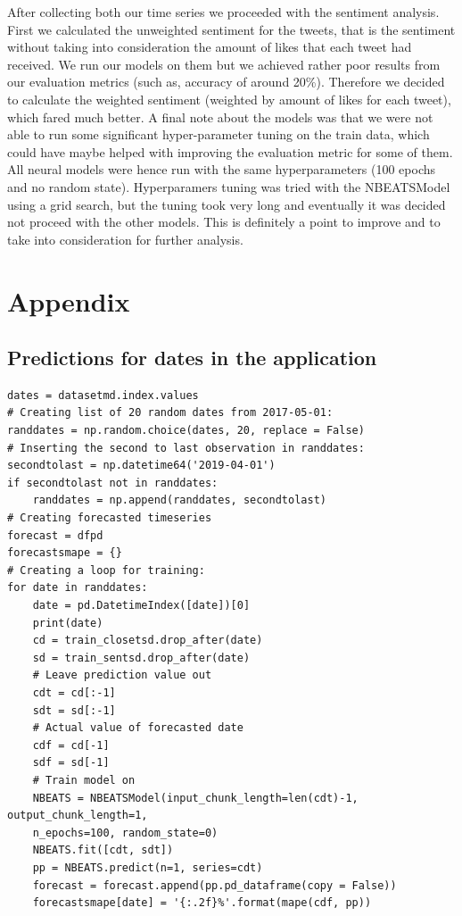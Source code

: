 \documentclass{article}
\begin{document}
After collecting both our time series we proceeded with the sentiment analysis. First we calculated the unweighted sentiment for the tweets, that is the sentiment without taking into consideration the amount of likes that each tweet had received. We run our models on them but we achieved rather poor results from our evaluation metrics (such as, accuracy of around 20\%). Therefore we decided to calculate the weighted sentiment (weighted by amount of likes for each tweet), which fared much better.
A final note about the models was that we were not able to run some significant hyper-parameter tuning on the train data, which could have maybe helped with improving the evaluation metric for some of them. All neural models were hence run with the same hyperparameters (100 epochs and no random state). Hyperparamers tuning  was tried with the NBEATSModel using a grid search, but the tuning took very long and eventually it was decided not proceed with the other models. This is definitely a point to improve and to take into consideration for further analysis.
\section{Appendix}
\subsection{Predictions for dates in the application}
\begin{verbatim}
dates = datasetmd.index.values
# Creating list of 20 random dates from 2017-05-01: 
randdates = np.random.choice(dates, 20, replace = False)
# Inserting the second to last observation in randdates: 
secondtolast = np.datetime64('2019-04-01')
if secondtolast not in randdates:
    randdates = np.append(randdates, secondtolast)
# Creating forecasted timeseries
forecast = dfpd
forecastsmape = {}
# Creating a loop for training: 
for date in randdates:
    date = pd.DatetimeIndex([date])[0]
    print(date)
    cd = train_closetsd.drop_after(date)
    sd = train_sentsd.drop_after(date)
    # Leave prediction value out
    cdt = cd[:-1]
    sdt = sd[:-1]
    # Actual value of forecasted date
    cdf = cd[-1]
    sdf = sd[-1]
    # Train model on 
    NBEATS = NBEATSModel(input_chunk_length=len(cdt)-1, output_chunk_length=1, 
    n_epochs=100, random_state=0)
    NBEATS.fit([cdt, sdt])
    pp = NBEATS.predict(n=1, series=cdt)
    forecast = forecast.append(pp.pd_dataframe(copy = False))
    forecastsmape[date] = '{:.2f}%'.format(mape(cdf, pp))
\end{verbatim}
\end{document}
